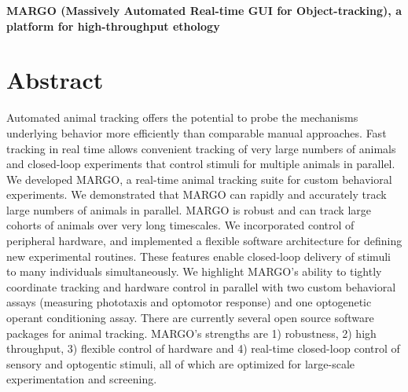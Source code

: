 \documentclass[10pt]{article}
\begin{document}
	
\renewcommand*\rmdefault{phv}
\selectfont
{}



\begin{center}
	\LARGE\textbf{MARGO (Massively Automated Real-time GUI for Object-tracking), a platform for high-throughput ethology}\\
	\large\textbf{}
\end{center}

\section*{Abstract}

Automated animal tracking offers the potential to probe the mechanisms underlying behavior more efficiently than comparable manual approaches. Fast tracking in real time allows convenient tracking of very large numbers of animals and closed-loop experiments that control stimuli for multiple animals in parallel. We developed MARGO, a real-time animal tracking suite for custom behavioral experiments. We demonstrated that MARGO can rapidly and accurately track large numbers of animals in parallel. MARGO is robust and can track large cohorts of animals over very long timescales. We incorporated control of peripheral hardware, and implemented a flexible software architecture for defining new experimental routines. These features enable closed-loop delivery of stimuli to many individuals simultaneously. We highlight MARGO's ability to tightly coordinate tracking and hardware control in parallel with two custom behavioral assays (measuring phototaxis and optomotor response) and one optogenetic operant conditioning assay. There are currently several open source software packages for animal tracking. MARGO’s strengths are 1) robustness, 2) high throughput, 3) flexible control of hardware and 4) real-time closed-loop control of sensory and optogentic stimuli, all of which are optimized for large-scale experimentation and screening.
\end{document}
